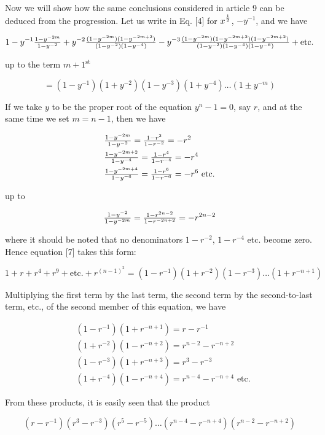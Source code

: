 \documentclass[twoside,12pt, showframe]{memoir}
\let\oldfrac\frac
\def\frac#1#2{\mathchoice{\tfrac{#1}{#2}}{\oldfrac{#1}{#2}}{\genfrac{}{}{}{2}{#1}{#2\mathstrut}}{\genfrac{}{}{}{3}{#1}{#2\mathstrut}}}
\begin{document}
Now we will show how the same conclusions considered in article 9 can be deduced from the progression. Let us write in Eq. [4] for \(x^{\frac{1}{2}}\), \(-y^{-1}\), and we have

\[1-y^{-1} \frac{1-y^{-2 m}}{1-y^{-2}}+y^{-2} \frac{(1-y^{-2 m})(1-y^{-2 m+2})}{(1-y^{-2})(1-y^{-4})}-y^{-3} \frac{(1-y^{-2 m})(1-y^{-2 m+2})(1-y^{-2 m+2})}{(1-y^{-2})(1-y^{-4})(1-y^{-6})}+\text{etc.}\]

up to the term \(m+1^{\text{st}}\)

\[=(1-y^{-1})(1+y^{-2})(1-y^{-3})(1+y^{-4}) \ldots(1 \pm y^{-m})\tag{7}\]

If we take \(y\) to be the proper root of the equation \(y^{n}-1=0\), say \(r\), and at the same time we set \(m=n-1\), then we have

\[\begin{aligned}
& \frac{1-y^{-2 m}}{1-y^{-2}}=\frac{1-r^{2}}{1-r^{-2}}=-r^{2} \\
& \frac{1-y^{-2 m+2}}{1-y^{-4}}=\frac{1-r^{4}}{1-r^{-4}}=-r^{4} \\
& \frac{1-y^{-2 m+4}}{1-y^{-6}}=\frac{1-r^{6}}{1-r^{-6}}=-r^{6} \text{ etc.}
\end{aligned}\]

up to

\[\frac{1-y^{-2}}{1-y^{-2 m}}=\frac{1-r^{2 n-2}}{1-r^{-2 n+2}}=-r^{2 n-2}\]

where it should be noted that no denominators \(1-r^{-2}\), \(1-r^{-4}\) etc. become zero. Hence equation [7] takes this form:

\[1+r+r^{4}+r^{9}+\text{etc.}+r^{(n-1)^{2}}=(1-r^{-1})(1+r^{-2})(1-r^{-3}) \ldots(1+r^{-n+1})\]

Multiplying the first term by the last term, the second term by the second-to-last term, etc., of the second member of this equation, we have

\[\begin{aligned}
& (1-r^{-1})(1+r^{-n+1})=r-r^{-1} \\
& (1+r^{-2})(1-r^{-n+2})=r^{n-2}-r^{-n+2} \\
& (1-r^{-3})(1+r^{-n+3})=r^{3}-r^{-3} \\
& (1+r^{-4})(1-r^{-n+4})=r^{n-4}-r^{-n+4} \text{ etc.}
\end{aligned}\]
  
From these products, it is easily seen that the product
  
\[(r-r^{-1})(r^{3}-r^{-3})(r^{5}-r^{-5}) \ldots(r^{n-4}-r^{-n+4})(r^{n-2}-r^{-n+2})\]
  
\end{document}
